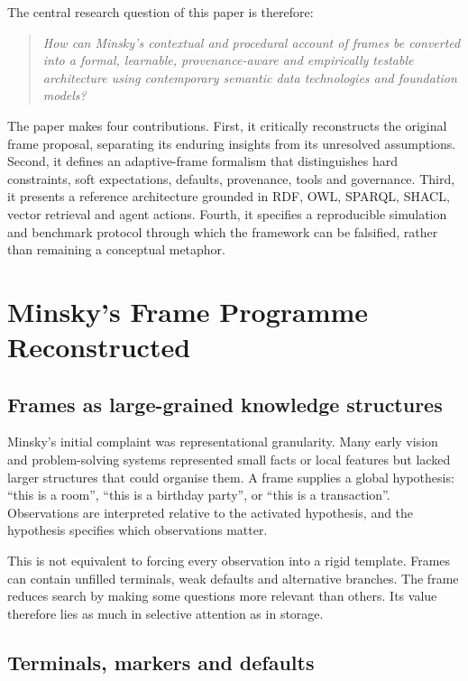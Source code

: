 \documentclass[11pt,a4paper]{article}
\begin{document}
The central research question of this paper is therefore:

\begin{quote}
\emph{How can Minsky's contextual and procedural account of frames be converted
into a formal, learnable, provenance-aware and empirically testable architecture
using contemporary semantic data technologies and foundation models?}
\end{quote}

The paper makes four contributions. First, it critically reconstructs the
original frame proposal, separating its enduring insights from its unresolved
assumptions. Second, it defines an adaptive-frame formalism that distinguishes
hard constraints, soft expectations, defaults, provenance, tools and governance.
Third, it presents a reference architecture grounded in RDF, OWL, SPARQL, SHACL,
vector retrieval and agent actions. Fourth, it specifies a reproducible
simulation and benchmark protocol through which the framework can be falsified,
rather than remaining a conceptual metaphor.

\section{Minsky's Frame Programme Reconstructed}

\subsection{Frames as large-grained knowledge structures}

Minsky's initial complaint was representational granularity. Many early vision
and problem-solving systems represented small facts or local features but lacked
larger structures that could organise them. A frame supplies a global hypothesis:
``this is a room'', ``this is a birthday party'', or ``this is a transaction''.
Observations are interpreted relative to the activated hypothesis, and the
hypothesis specifies which observations matter.

This is not equivalent to forcing every observation into a rigid template.
Frames can contain unfilled terminals, weak defaults and alternative branches.
The frame reduces search by making some questions more relevant than others.
Its value therefore lies as much in selective attention as in storage.

\subsection{Terminals, markers and defaults}
\end{document}
